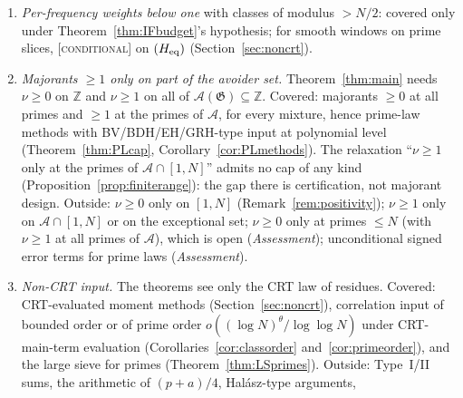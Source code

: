 \documentclass[10pt,reqno]{amsart}
\theoremstyle{definition}
\theoremstyle{remark}
\newcommand{\A}{\mathcal A}
\newcommand{\cG}{\mathfrak G}
\newcommand{\Z}{\mathbb Z}
\newcommand{\e}{\mathrm e}
\newcommand{\lab}[1]{\textup{[\textsc{#1}]}}
\begin{document}
\begin{enumerate}
  Kloosterman, Erd\H{o}s--Tur\'an/Vaaler, floor/ceiling, smooth windows)
  (Corollary~\ref{cor:IFcap}); bounds that dominate the large
  coefficient mass up to $\e^{O((\log N)^{3/4})}$ (Theorem~\ref{thm:IFbudget});
  hybrid methods whose free large mass is $\leq cB$
  (Section~\ref{sec:hybrid}).  Outside: hybrids with large right-signed
  mass at moduli in $(N/2,CN]$, and all hybrids unless Flat holds with
  margins $\log(1/t),\log\Delta=O((\log N)^{3/4})$ (Theorem~\ref{thm:hybridcap}); such
  Flat follows from weak SPW (Hypothesis~\ref{hyp:weakSPW}, \lab{open},
  Lemma~\ref{lem:weakSPW}), while SPW with a fixed margin is false
  (Theorem~\ref{thm:SPWfalse}); direct counts of
  multi-witness patterns of combined modulus $>N/2$.  For finite prime-slice
  families every per-frequency rounding with weight $\geq1$ is covered
  for any moduli (Theorem~\ref{thm:perfreq}).
\item \emph{Per-frequency weights below one} with classes of modulus
  $>N/2$: covered only under Theorem~\ref{thm:IFbudget}'s hypothesis;
  for smooth windows on prime slices, \lab{conditional} on $(H_{\rm eq})$
  (Section~\ref{sec:noncrt}).
\item \emph{Majorants $\geq1$ only on part of the avoider set.}
  Theorem~\ref{thm:main} needs $\nu\geq0$ on $\Z$ and $\nu\geq1$ on all of
  $\A(\cG)\subseteq\Z$.  Covered: majorants $\geq0$ at all primes and $\geq1$ at
  the primes of $\A$, for every mixture, hence prime-law methods with
  BV/BDH/EH/GRH-type input at polynomial level (Theorem~\ref{thm:PLcap},
  Corollary~\ref{cor:PLmethods}).  The relaxation ``$\nu\geq1$ only at the
  primes of $\A\cap[1,N]$'' admits no cap of any kind
  (Proposition~\ref{prop:finiterange}): the gap there is certification,
  not majorant design.  Outside: $\nu\geq0$ only on $[1,N]$
  (Remark~\ref{rem:positivity}); $\nu\geq1$ only on $\A\cap[1,N]$ or on the
  exceptional set; $\nu\geq0$ only at primes $\leq N$ (with $\nu\geq1$ at all
  primes of $\A$), which is open (\emph{Assessment}); unconditional
  signed error terms for prime laws (\emph{Assessment}).
\item\label{it:nonCRT} \emph{Non-CRT input.}  The theorems see only the CRT law of
  residues.  Covered: CRT-evaluated moment methods
  (Section~\ref{sec:noncrt}), correlation input of bounded order or of
  prime order $o((\log N)^\theta/\log\log N)$ under CRT-main-term evaluation
  (Corollaries~\ref{cor:classorder} and~\ref{cor:primeorder}), and the
  large sieve for primes (Theorem~\ref{thm:LSprimes}).  Outside:
  Type~I/II sums, the arithmetic of $(p+a)/4$, Hal\'asz-type arguments,

\end{enumerate}
\end{document}
